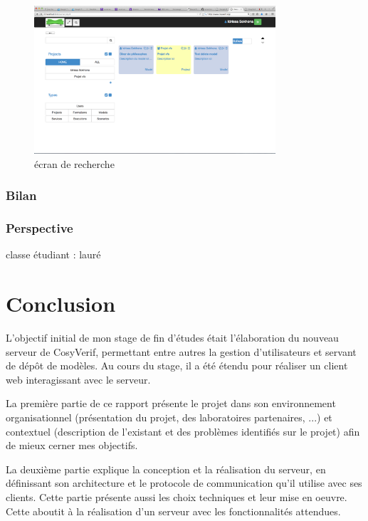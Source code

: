 \documentclass{report}
\begin{document}
\newpage

\begin{figure}[h!]
     \centering
     \includegraphics[width=0.8\textwidth] {img/1-ecran-recherche}
     \caption{écran de recherche}
\end{figure}







\subsection{Bilan}
\subsection{Perspective}
classe étudiant : lauré



\chapter*{Conclusion}

L'objectif initial de mon stage de fin d'études était l'élaboration du
nouveau serveur de CosyVerif, permettant entre autres la gestion
d'utilisateurs et servant de dépôt de modèles.
Au cours du stage, il a été étendu pour réaliser un client web interagissant avec le serveur.

La première partie de ce rapport présente le projet dans son environnement organisationnel
(présentation du projet, des laboratoires partenaires, ...)
et contextuel (description de l'existant et des problèmes identifiés sur le
projet)
afin de mieux cerner mes objectifs.

La deuxième partie explique la conception et la réalisation du serveur, en définissant son architecture et le protocole de communication
qu'il utilise avec ses clients. Cette partie présente aussi les choix
techniques et leur mise en oeuvre.
Cette aboutit à la réalisation d'un serveur avec les fonctionnalités attendues.
\end{document}
